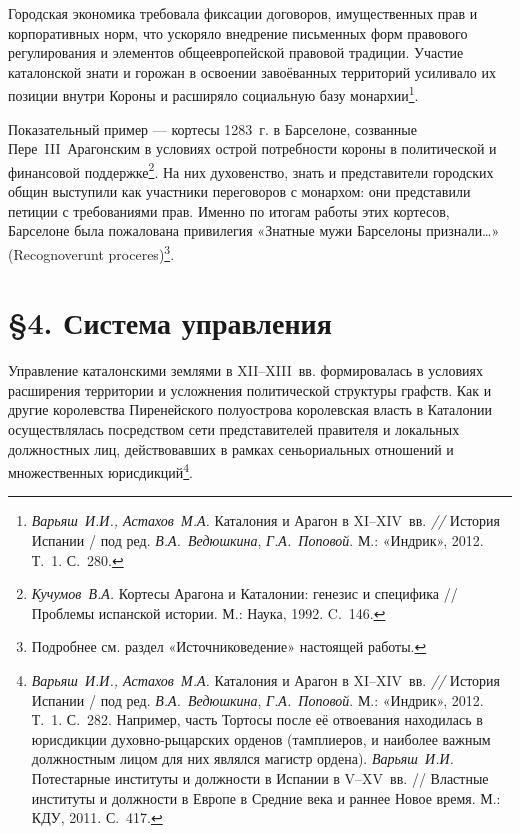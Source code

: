 Городская экономика требовала фиксации договоров, имущественных прав и корпоративных норм, что ускоряло внедрение письменных форм правового регулирования и элементов общеевропейской правовой традиции. Участие каталонской знати и горожан в освоении завоёванных территорий усиливало их позиции внутри Короны и расширяло социальную базу монархии\footnote{\emph{Варьяш}\emph{~И.И., Астахов~М.А.} Каталония и Арагон в XI--XIV~вв. \emph{// }История Испании / под ред. \emph{В.А.~Ведюшкина}, \emph{Г.А.~Поповой}. М.: «Индрик», 2012. Т.~1. С.~280.}.

Показательный пример --- кортесы 1283~г. в Барселоне, созванные Пере~III~Арагонским в условиях острой потребности короны в политической и финансовой поддержке\footnote{\emph{Кучумов}\emph{~}\emph{В.А. }Кортесы Арагона и Каталонии: генезис и специфика // Проблемы испанской истории. М.: Наука, 1992. C.~146.}. На них духовенство, знать и представители городских общин выступили как участники переговоров с монархом: они представили петиции с требованиями прав. Именно по итогам работы этих кортесов, Барселоне была пожалована привилегия «Знатные мужи Барселоны признали…» (Recognoverunt proceres)\footnote{Подробнее см. раздел «Источниковедение» настоящей работы.}.

\section*{§4. Система управления}

Управление каталонскими землями в XII--XIII~вв. формировалась в условиях расширения территории и усложнения политической структуры графств. Как и другие королевства Пиренейского полуострова королевская власть в Каталонии осуществлялась посредством сети представителей правителя и локальных должностных лиц, действовавших в рамках сеньориальных отношений и множественных юрисдикций\footnote{\emph{Варьяш}\emph{~И.И., Астахов~М.А.} Каталония и Арагон в XI--XIV~вв. \emph{// }История Испании / под ред. \emph{В.А.~Ведюшкина}, \emph{Г.А.~Поповой}. М.: «Индрик», 2012. Т.~1. С.~282. Например, часть Тортосы после её отвоевания находилась в юрисдикции духовно-рыцарских орденов (тамплиеров, и наиболее важным должностным лицом для них являлся магистр ордена). \emph{Варьяш}\emph{~}\emph{И.И.} Потестарные институты и должности в Испании в V--XV~вв. // Властные институты и должности в Европе в Средние века и раннее Новое время. М.: КДУ, 2011. С.~417.}.

